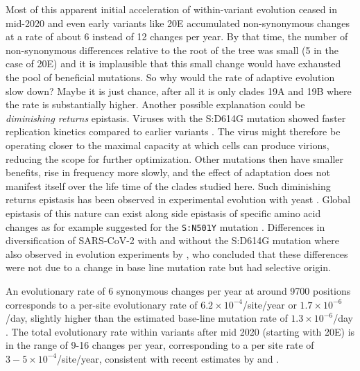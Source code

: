 \documentclass[aps,rmp, twocolumn]{revtex4}
\begin{document}
Most of this apparent initial acceleration of within-variant evolution ceased in mid-2020 and even early variants like 20E accumulated non-synonymous changes at a rate of about 6 instead of 12 changes per year.
By that time, the number of non-synonymous differences relative to the root of the tree was small (5 in the case of 20E) and it is implausible that this small change would have exhausted the pool of beneficial mutations.
So why would the rate of adaptive evolution slow down?
Maybe it is just chance, after all it is only clades 19A and 19B where the rate is substantially higher.
Another possible explanation could be \emph{diminishing returns} epistasis.
Viruses with the S:D614G mutation showed faster replication kinetics compared to earlier variants \citep{korber_tracking_2020}.
The virus might therefore be operating closer to the maximal capacity at which cells can produce virions, reducing the scope for further optimization.
Other mutations then have smaller benefits, rise in frequency more slowly, and the effect of adaptation does not manifest itself over the life time of the clades studied here.
Such diminishing returns epistasis has been observed in experimental evolution with yeast \citep{kryazhimskiy_global_2014}.
Global epistasis of this nature can exist along side epistasis of specific amino acid changes as for example suggested for the \texttt{S:N501Y} mutation \citep{martin_emergence_2021,rochman_epistasis_2022,martin_selection_2022}.
Differences in diversification of SARS-CoV-2 with and without the S:D614G mutation where also observed in evolution experiments by \citet{amicone_mutation_2022}, who concluded that these differences were not due to a change in base line mutation rate but had selective origin.

An evolutionary rate of 6 synonymous changes per year at around 9700 positions corresponds to a per-site evolutionary rate of $6.2\times 10^{-4}$/site/year or $1.7\times 10^{-6}$/day, slightly higher than the estimated base-line mutation rate of $1.3\times 10^{-6}$/day \citep{amicone_mutation_2022}.
The total evolutionary rate within variants after mid 2020 (starting with 20E) is in the range of 9-16 changes per year, corresponding to a per site rate of $3 - 5\times 10^{-4}$/site/year, consistent with recent estimates by \citet{hill_origins_2022} and \citet{tay_emergence_2022}.
\end{document}
